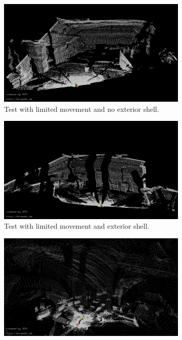 \begin{figure}
\\\vspace{0.5cm}
\begin{subfigure}[b]{0.32\textwidth}
	\centering
	\includegraphics[width=\textwidth]{../Media/FirstDecentMap}
	\caption{Test with limited movement and no exterior shell.}
	\label{sec:experimentalResults:3DLaserScanning:fig:firstpointcloud}
\end{subfigure}
\begin{subfigure}[b]{0.32\textwidth}
	\centering
	\includegraphics[width=\textwidth]{../Media/testScanWithTop}
	\caption{Test with limited movement and exterior shell.}
	\label{sec:experimentalResults:3DLaserScanning:fig:secondpointcloud}
\end{subfigure}
\begin{subfigure}[b]{0.32\textwidth}
	\centering
	\includegraphics[width=\textwidth]{../Media/RollingTestMap}

\end{subfigure}
\end{figure}
